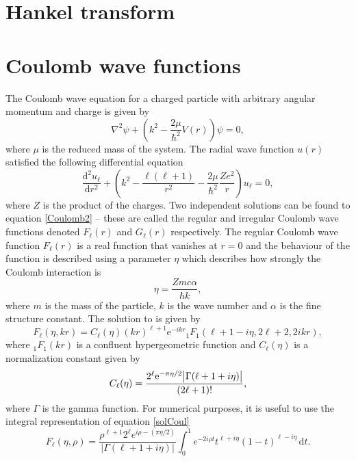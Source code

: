 \section{Hankel transform}
\section{Coulomb wave functions}\label{sec:Coulomb}
The Coulomb wave equation for a charged particle with arbitrary angular momentum and charge is given by 
\begin{equation} \label{Coulomb1}
	\nabla^2\psi +\left( k^2-\frac{2\mu}{\hbar^2}V(r)\right)\psi = 0,
\end{equation}
where $\mu$ is the reduced mass of the system. The radial wave function $u(r)$ satisfied the following differential equation
\begin{equation} \label{Coulomb2}
	\frac{\text{d}^2 u_\ell}{\text{d}r^2}+\left( k^2-\frac{\ell(\ell+1)}{r^2}-\frac{2\mu}{\hbar^2}\frac{Ze^2}{r}\right)u_\ell=0,
\end{equation}
where $Z$ is the product of the charges. Two independent solutions can be found to equation \eqref{Coulomb2} -- these are called the regular and irregular Coulomb wave functions denoted $F_\ell(r)$ and $G_\ell(r)$ respectively. The regular Coulomb wave function $F_\ell(r)$ is a real function that vanishes at $r=0$ and the behaviour of the function is described using a parameter $\eta$ which describes how strongly the Coulomb interaction is
\begin{equation} \label{etafactor}
	\eta = \frac{Zmc\alpha }{\hbar k},
\end{equation}
where $m$ is the mass of the particle, $k$ is the wave number and $\alpha$ is the fine structure constant. The solution to is given by
\begin{equation} \label{solCoul}
	F_\ell(\eta,kr) = C_\ell (\eta) (kr)^{\ell+1}\text{e}^{-ikr}  {}_1 F_1(\ell+1-i\eta,2\ell+2,2ikr),
\end{equation}
where ${}_1F_1(kr)$ is a confluent hypergeometric function and $C_\ell(\eta)$ is a normalization constant given by 
\begin{equation} \label{normalization}
	C_\ell(\eta) = \frac{2^\ell \text{e}^{-\pi\eta/2}\abs{\Gamma(\ell+1+i\eta)}}{(2\ell+1)!},
\end{equation}
where $\Gamma$ is the gamma function. For numerical purposes, it is useful to use the integral representation of equation \eqref{solCoul} \cite[eq. 33.7.1]{NIST} 
\begin{equation} \label{integralrep}
	F_\ell(\eta,\rho) = \frac{\rho^{\ell+1}2^\ell e^{i\rho-(\pi\eta/2)}}{|\Gamma(\ell+1+i\eta)|} \int_0^1 e^{-2i\rho t}t^{\ell+i\eta}(1-t)^{\ell-i\eta} \, \text{d}t.
\end{equation}
